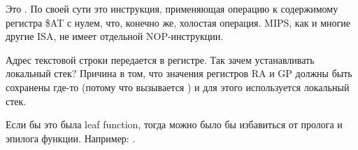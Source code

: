 Это .
По своей сути это инструкция, применяющая операцию  к содержимому регистра \$AT с нулем,
что, конечно же, холостая операция.
MIPS, как и многие другие \ac{ISA}, не имеет отдельной \ac{NOP}-инструкции.


Адрес текстовой строки передается в регистре.
Так зачем устанавливать локальный стек?
Причина в том, что значения регистров \ac{RA} и GP должны быть сохранены где-то
(потому что вызывается \printf) и для этого используется локальный стек.

Если бы это была \gls{leaf function}, тогда можно было бы избавиться от пролога и эпилога функции. Например:
 .




